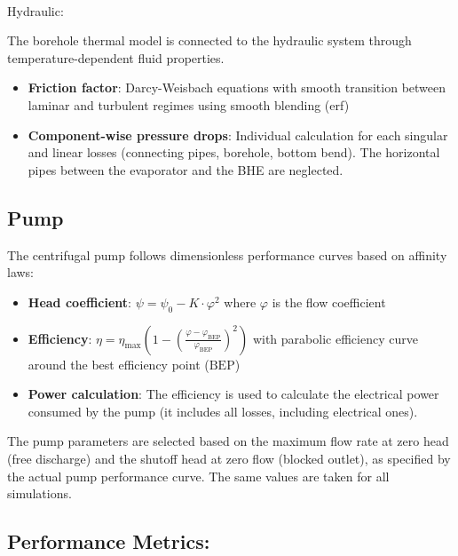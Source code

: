 \documentclass[journal=iecr,manuscript=]{achemso}
\makeatletter
\let\oldparagraph\paragraph
\renewcommand{\paragraph}{
    \@ifstar
      \xxxParagraphStar
      \xxxParagraphNoStar
  }
\newcommand{\xxxParagraphStar}[1]{\oldparagraph*{#1}\mbox{}}
\newcommand{\xxxParagraphNoStar}[1]{\oldparagraph{#1}\mbox{}}
\makeatother
\begin{document}
\paragraph{Hydraulic:}\label{hydraulic}

The borehole thermal model is connected to the hydraulic system through
temperature-dependent fluid properties.

\begin{itemize}
\item
  \textbf{Friction factor}: Darcy-Weisbach equations with smooth
  transition between laminar and turbulent regimes using smooth blending
  (erf)
\item
  \textbf{Component-wise pressure drops}: Individual calculation for
  each singular and linear losses (connecting pipes, borehole, bottom
  bend). The horizontal pipes between the evaporator and the BHE are
  neglected.
\end{itemize}

\subsection{Pump}\label{pump}

The centrifugal pump follows dimensionless performance curves based on
affinity laws:

\begin{itemize}
\item
  \textbf{Head coefficient}: \(\psi = \psi_0 - K \cdot \varphi^2\) where
  \(\varphi\) is the flow coefficient
\item
  \textbf{Efficiency}:
  \(\eta = \eta_{\text{max}} \left(1 - \left(\frac{\varphi - \varphi_{\text{BEP}}}{\varphi_{\text{BEP}}}\right)^2\right)\)
  with parabolic efficiency curve around the best efficiency point
  (\(\text{BEP}\))
\item
  \textbf{Power calculation}: The efficiency is used to calculate the
  electrical power consumed by the pump (it includes all losses,
  including electrical ones).
\end{itemize}

The pump parameters are selected based on the maximum flow rate at zero
head (free discharge) and the shutoff head at zero flow (blocked
outlet), as specified by the actual pump performance curve. The same
values are taken for all simulations.

\subsection{Performance Metrics:}\label{performance-metrics}
\end{document}
